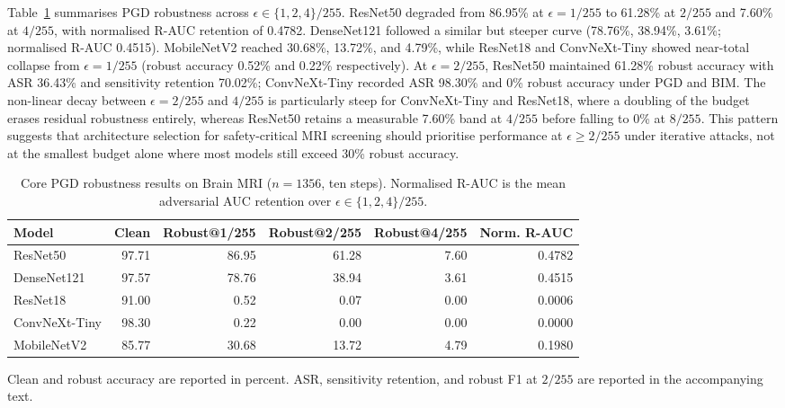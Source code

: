 \documentclass[12pt,a4paper,oneside]{report}
\begin{document}
Table~\ref{tab:brain_mri_pgd_robustness_five_models} summarises PGD robustness across $\epsilon \in \{1,2,4\}/255$. ResNet50 degraded from 86.95\% at $\epsilon = 1/255$ to 61.28\% at $2/255$ and 7.60\% at $4/255$, with normalised R-AUC retention of 0.4782. DenseNet121 followed a similar but steeper curve (78.76\%, 38.94\%, 3.61\%; normalised R-AUC 0.4515). MobileNetV2 reached 30.68\%, 13.72\%, and 4.79\%, while ResNet18 and ConvNeXt-Tiny showed near-total collapse from $\epsilon = 1/255$ (robust accuracy 0.52\% and 0.22\% respectively). At $\epsilon = 2/255$, ResNet50 maintained 61.28\% robust accuracy with ASR 36.43\% and sensitivity retention 70.02\%; ConvNeXt-Tiny recorded ASR 98.30\% and 0\% robust accuracy under PGD and BIM. The non-linear decay between $\epsilon = 2/255$ and $4/255$ is particularly steep for ConvNeXt-Tiny and ResNet18, where a doubling of the budget erases residual robustness entirely, whereas ResNet50 retains a measurable 7.60\% band at $4/255$ before falling to 0\% at $8/255$. This pattern suggests that architecture selection for safety-critical MRI screening should prioritise performance at $\epsilon \ge 2/255$ under iterative attacks, not at the smallest budget alone where most models still exceed 30\% robust accuracy.

\begin{table}[htbp]
  \centering
  \caption{Core PGD robustness results on Brain MRI ($n=1356$, ten steps). Normalised R-AUC is the mean adversarial AUC retention over $\epsilon\in\{1,2,4\}/255$.}
  \label{tab:brain_mri_pgd_robustness_five_models}
  \begin{tabular}{lrrrrr}
    \toprule
    Model & Clean & Robust@1/255 & Robust@2/255 & Robust@4/255 & Norm. R-AUC \\
    \midrule
    ResNet50      & 97.71 & 86.95 & 61.28 & 7.60 & 0.4782 \\
    DenseNet121   & 97.57 & 78.76 & 38.94 & 3.61 & 0.4515 \\
    ResNet18      & 91.00 &  0.52 &  0.07 & 0.00 & 0.0006 \\
    ConvNeXt-Tiny & 98.30 &  0.22 &  0.00 & 0.00 & 0.0000 \\
    MobileNetV2   & 85.77 & 30.68 & 13.72 & 4.79 & 0.1980 \\
    \bottomrule
  \end{tabular}
  \vspace{0.25em}
  \begin{minipage}{0.88\linewidth}
    \footnotesize
    Clean and robust accuracy are reported in percent. ASR, sensitivity retention,
    and robust F1 at $2/255$ are reported in the accompanying text.
  \end{minipage}
\end{table}
\end{document}

